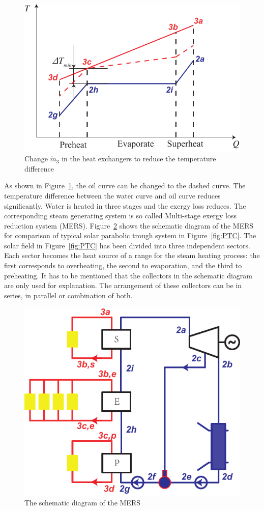 \noindent \begin{figure}[htbp]
\begin{center}
	\includegraphics[width = 0.7\columnwidth]{fig/BetterCurve}
	\caption{Change $\dot{m}_3$ in the heat exchangers to reduce the temperature difference}
	\label{fig:BetterCurve}
\end{center}
\end{figure}

As shown in Figure~\ref{fig:BetterCurve}, the oil curve can be changed to the dashed curve. The temperature difference between the water curve and oil curve reduces significantly. Water is heated in three stages and the exergy loss reduces. The corresponding steam generating system is so called Multi-stage exergy loss reduction system (MERS).
Figure~\ref{fig:SEP} shows the schematic diagram of the MERS for comparison of typical solar parabolic trough system in Figure~\ref{fig:PTC}. The solar field in Figure~\ref{fig:PTC} has been divided into three independent sectors. Each sector becomes the heat source of a range for the steam heating process: the first corresponds to overheating, the second to evaporation, and the third to preheating. 
It has to be mentioned that the collectors in the schematic diagram are only used for explanation. The arrangement of these collectors can be in series, in parallel or combination of both.

\noindent \begin{figure}[htbp]
\begin{center}
	\includegraphics[width = 0.7\columnwidth]{fig/SEP}
	\caption{The schematic diagram of the MERS}
	\label{fig:SEP}
\end{center}
\end{figure}

